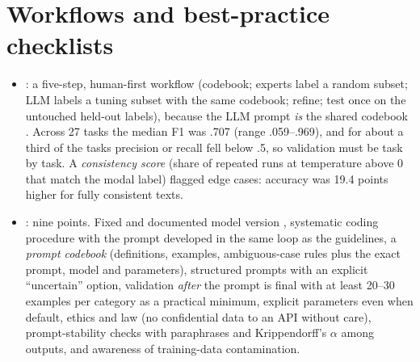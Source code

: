 \section{Workflows and best-practice checklists}
\begin{itemize}
\item {}: a five-step, human-first workflow (codebook; experts label a random subset; LLM labels a tuning subset with the same codebook; refine; test once on the untouched held-out labels), because the LLM prompt \emph{is} the shared codebook . Across 27 tasks the median F1 was .707 (range .059--.969), and for about a third of the tasks precision or recall fell below .5, so validation must be task by task. A \emph{consistency score} (share of repeated runs at temperature above 0 that match the modal label) flagged edge cases: accuracy was 19.4 points higher for fully consistent texts.
\item {}: nine points. Fixed and documented model version , systematic coding procedure with the prompt developed in the same loop as the guidelines, a \emph{prompt codebook} (definitions, examples, ambiguous-case rules plus the exact prompt, model and parameters), structured prompts with an explicit ``uncertain'' option, validation \emph{after} the prompt is final  with at least 20--30 examples per category as a practical minimum, explicit parameters even when default, ethics and law (no confidential data to an API without care), prompt-stability checks with paraphrases  and Krippendorff's $\alpha$ among outputs, and awareness of training-data contamination.

\end{itemize}

